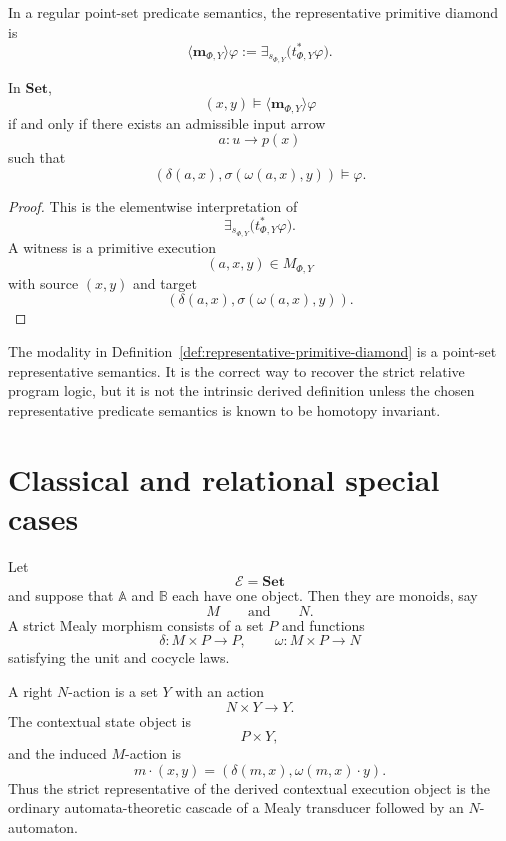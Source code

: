 \begin{definition}
\label{def:representative-primitive-diamond}
In a regular point-set predicate semantics, the representative primitive
diamond is
\[
\langle\mathbf m_{\Phi,Y}\rangle\varphi
:=
\exists_{s_{\Phi,Y}}\bigl(t_{\Phi,Y}^\ast\varphi\bigr).
\]
\end{definition}

\begin{proposition}
\label{prop:representative-primitive-diamond-reading}
In \(\mathbf{Set}\),
\[
(x,y)\models\langle\mathbf m_{\Phi,Y}\rangle\varphi
\]
if and only if there exists an admissible input arrow
\[
a:u\to p(x)
\]
such that
\[
\left(
\delta(a,x),
\sigma(\omega(a,x),y)
\right)
\models\varphi.
\]
\end{proposition}

\begin{proof}
This is the elementwise interpretation of
\[
\exists_{s_{\Phi,Y}}\bigl(t_{\Phi,Y}^\ast\varphi\bigr).
\]
A witness is a primitive execution
\[
(a,x,y)\in M_{\Phi,Y}
\]
with source \((x,y)\) and target
\[
\left(
\delta(a,x),
\sigma(\omega(a,x),y)
\right).
\]
\end{proof}

\begin{remark}
\label{rem:representative-semantics-not-intrinsic}
The modality in
Definition~\ref{def:representative-primitive-diamond} is a point-set
representative semantics. It is the correct way to recover the strict relative
program logic, but it is not the intrinsic derived definition unless the
chosen representative predicate semantics is known to be homotopy invariant.
\end{remark}

\section{Classical and relational special cases}
\label{sec:derived-relative-classical-special-cases}

\begin{example}
\label{ex:derived-classical-mealy-cascades}
Let
\[
\mathcal E=\mathbf{Set}
\]
and suppose that \(\mathbb A\) and \(\mathbb B\) each have one object. Then
they are monoids, say
\[
M
\qquad
\text{and}
\qquad
N.
\]
A strict Mealy morphism consists of a set \(P\) and functions
\[
\delta:M\times P\to P,
\qquad
\omega:M\times P\to N
\]
satisfying the unit and cocycle laws.

A right \(N\)-action is a set \(Y\) with an action
\[
N\times Y\to Y.
\]
The contextual state object is
\[
P\times Y,
\]
and the induced \(M\)-action is
\[
m\cdot(x,y)
=
\left(
\delta(m,x),
\omega(m,x)\cdot y
\right).
\]
Thus the strict representative of the derived contextual execution object is
the ordinary automata-theoretic cascade of a Mealy transducer followed by an
\(N\)-automaton.
\end{example}


